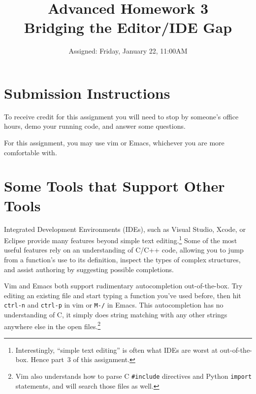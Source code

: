 \documentclass{article}
\begin{document}
\fancyfoot[C]{\color{gray} \thepage~/~\pageref*{LastPage}}
\pagestyle{fancyplain}


\title{\textbf{Advanced Homework 3\\Bridging the Editor/IDE Gap}}
\author{Assigned: Friday, January 22, 11:00AM}
\date{\textbf{\color{red}{Due: Before the end of the final office hours this week (Thursday, $\sim$5:30PM)}}}
\maketitle


\section*{Submission Instructions}
To receive credit for this assignment you will need to stop by someone's
office hours, demo your running code, and answer some questions.

\medskip
\noindent
For this assignment, you may use vim or Emacs, whichever you are more
comfortable with.

\section{Some Tools that Support Other Tools}

Integrated Development Environments (IDEs), such as Visual Studio, Xcode, or
Eclipse provide many features beyond simple text editing.\footnote{
  Interestingly, ``simple text editing'' is often what IDEs are worst at
  out-of-the-box. Hence part~3 of this assignment.
}
Some of the most useful features rely on an understanding of C/C++ code,
allowing you to jump from a function's use to its definition, inspect the types
of complex structures, and assist authoring by suggesting possible
completions.

Vim and Emacs both support rudimentary autocompletion out-of-the-box. Try
editing an existing file and start typing a function you've used before, then
hit \texttt{ctrl-n} and \texttt{ctrl-p} in vim or \texttt{M-/} in Emacs. This
autocompletion has no understanding of C, it simply does string matching with
any other strings anywhere else in the open files.\footnote{
  Vim also understands how to parse C \texttt{\#include} directives and Python
  \texttt{import} statements, and will search those files as well.
}
\end{document}
